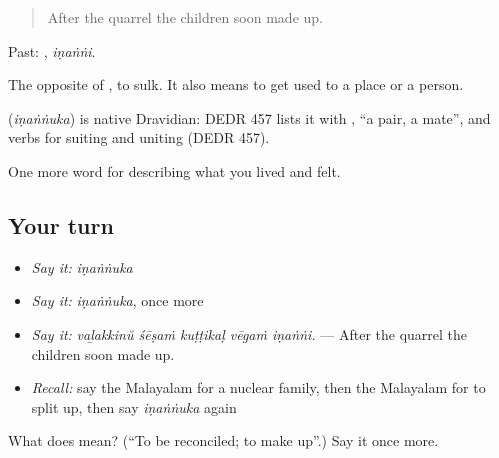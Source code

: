 \begin{quote}
After the quarrel the children soon made up.
\end{quote}

Past: , \emph{iṇaṅṅi}.

The opposite of , to sulk. It also means to get used to a place or a person.

\begin{cousinweb}
\textbf{} (\emph{iṇaṅṅuka}) is native Dravidian: DEDR 457 lists it with , \textquotedblleft{}a pair, a mate\textquotedblright{}, and verbs for suiting and uniting (DEDR 457).
\end{cousinweb}

\begin{grammarlens}[title={What you've built}]
One more word for describing what you lived and felt.
\end{grammarlens}

\subsection*{Your turn}
\begin{itemize}
\raggedright
  \item \emph{Say it:} \emph{iṇaṅṅuka}
  \item \emph{Say it:} \emph{iṇaṅṅuka}, once more
  \item \emph{Say it:} \emph{vaḻakkinŭ śēṣaṁ kuṭṭikaḷ vēgaṁ iṇaṅṅi.} — After the quarrel the children soon made up.
  \item \emph{Recall:} say the Malayalam for a nuclear family, then the Malayalam for to split up, then say \emph{iṇaṅṅuka} again
\end{itemize}

\begin{tcolorbox}[breakable,colback=teal!4,colframe=teal!35!black,title={Before you move on}]
What does  mean? (\textquotedblleft{}To be reconciled; to make up\textquotedblright{}.) Say it once more.
\end{tcolorbox}
